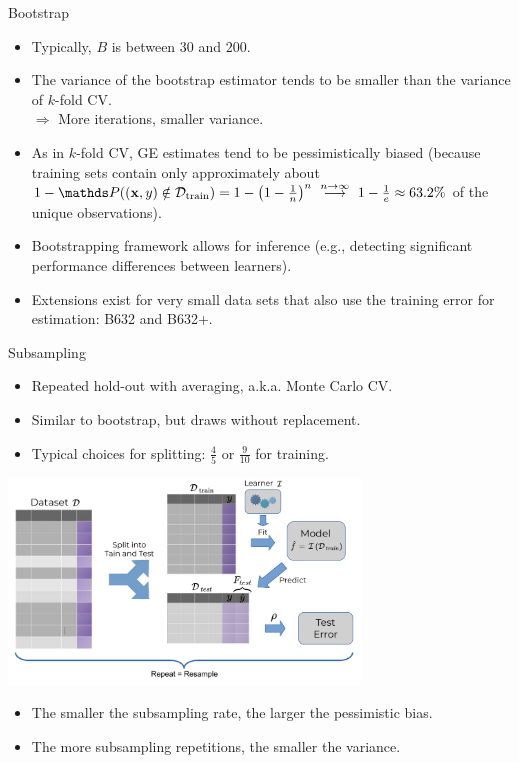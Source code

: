 \documentclass[11pt,compress,t,notes=noshow, xcolor=table]{beamer}
\begin{document}
\begin{vbframe}{Bootstrap}
\framebreak

\begin{itemize}
  \item Typically, $B$ is between $30$ and $200$.
  \item The variance of the bootstrap estimator tends to be smaller than the
  variance of $k$-fold CV. \\
  $\Rightarrow$ More iterations, smaller variance.
  \item As in $k$-fold CV, GE estimates tend to be pessimistically biased
  (because training sets contain only approximately about $1 - \P((\xv, y) \notin \Dtrain) = 1 - \left(1 - \frac{1}{n}\right)^n 
  \ \stackrel{n \to \infty}{\longrightarrow} \ 1-\frac{1}{e} \approx 63.2 \%$ of the unique 
  observations).
  \item Bootstrapping framework allows for inference 
  (e.g., detecting significant performance differences between learners).
  \item Extensions exist for very small data sets that also use the training 
  error for  estimation: B632 and B632+.

\end{itemize}

\end{vbframe}


\begin{vbframe}{Subsampling}

\begin{itemize}
  \item Repeated hold-out with averaging, a.k.a. Monte Carlo CV.
  \item Similar to bootstrap, but draws without replacement.
  \item Typical choices for splitting: $\frac{4}{5}$ or $\frac{9}{10}$ for 
  training.
\end{itemize}
\begin{center}
\includegraphics[width=0.7\textwidth]{figure_man/resampling_error.pdf}
\end{center}
\begin{itemize}
  \item The smaller the subsampling rate, the larger the pessimistic bias.
  \item The more subsampling repetitions, the smaller the variance.
\end{itemize}

\end{vbframe}
\end{document}
